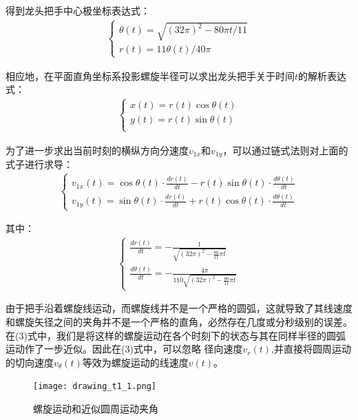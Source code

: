 \documentclass{cumcmthesis1}
\begin{document}
得到龙头把手中心极坐标表达式：
\begin{align}
    \begin{cases}
        \theta(t)=\sqrt{(32\pi)^2-80\pi t / 11}\\
        r(t)=11 \theta(t)/40 \pi 
    \end{cases}
\end{align}
\par
相应地，在平面直角坐标系投影螺旋半径可以求出龙头把手关于时间$t$的解析表达式：
\begin{align}
    \begin{cases}
        x(t) = r(t) \cos \theta(t)\\
        y(t) = r(t) \sin \theta(t)\\
    \end{cases}
\end{align}
\par
为了进一步求出当前时刻的横纵方向分速度$v_{1x}$和$v_{1y}$，可以通过链式法则对上面的式子进行求导：
\begin{align}
    \begin{cases}
        v_{1x}(t) = \cos\theta(t) \cdot \frac{dr(t)}{dt} - r(t) \sin\theta(t) \cdot \frac{d\theta(t)}{dt} \\
        v_{1y}(t)= \sin\theta(t) \cdot \frac{dr(t)}{dt} + r(t) \cos\theta(t) \cdot \frac{d\theta(t)}{dt}
    \end{cases}
\end{align}
\par
其中：
\begin{align}
    \begin{cases}
        \frac{dr(t)}{dt} = -\frac{1}{\sqrt{(32\pi)^2 - \frac{80}{11}\pi t}}\\
        \frac{d\theta(t)}{dt} = -\frac{4\pi}{110 \sqrt{(32\pi)^2 - \frac{80}{11}\pi t}}
    \end{cases}
\end{align}
\par
由于把手沿着螺旋线运动，而螺旋线并不是一个严格的圆弧，这就导致了其线速度和螺旋矢径之间的夹角并不是一个严格的直角，必然存在几度或分秒级别的误差。
在(3)式中，我们是将这样的螺旋运动在各个时刻下的状态与其在同样半径的圆弧运动作了一步近似。因此在(3)式中，可以忽略
径向速度$v_r(t)$,并直接将圆周运动的切向速度$v_\theta(t)$等效为螺旋运动的线速度$v(t)$。
\begin{figure}
    \caption{螺旋运动和近似圆周运动夹角}
    \centering    
    \texttt{[image: drawing\_t1\_1.png]}
\end{figure}
\par
\end{document}
